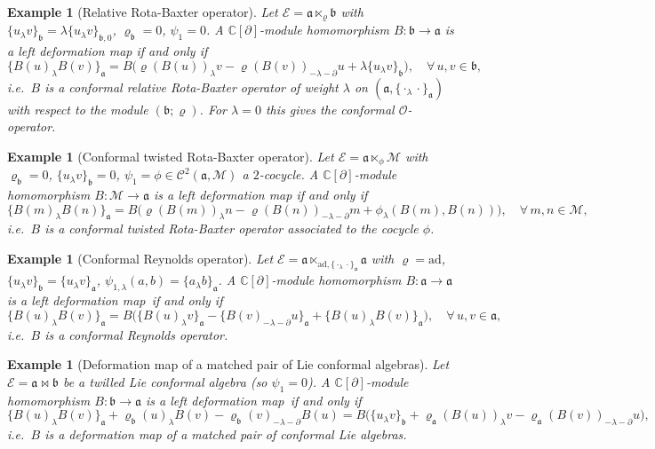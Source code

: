 \documentclass[a4paper,11pt]{article}
\def\Rg{\mathbb{C}[\partial]}
\def\Ep{\mathcal{E}}
\def\Vs{\mathfrak{a}}
\def\Ws{\mathfrak{b}}
\def\Mod{\mathcal{M}}
\def\rep{\varrho}
\def\Cch{\mathscr{C}}
\def\la{\lambda}
\def\p{\partial}
\newcommand{\ad}{\mathrm{ad}}
\numberwithin{equation}{section}
\newtheorem{example}[theorem]{Example}
\begin{document}
\begin{example}[Relative Rota-Baxter operator]\label{ex:conf-RRB}
Let $\Ep=\Vs\ltimes_\rep\Ws$ with $\{u_\la v\}_\Ws=\la\{u_\la v\}_{\Ws,0}$,
$\rep_\Ws=0$, $\psi_1=0$.
A $\Rg$-module homomorphism $B:\Ws\to\Vs$ is a left deformation map if and only if
\begin{equation}\label{eq:conf-RRB}
  \{B(u)_\la B(v)\}_\Vs
  = B\!\bigl(\rep(B(u))_\la v - \rep(B(v))_{-\la-\p}u
             + \la\{u_\la v\}_\Ws\bigr),
  \quad \forall\,u,v\in\Ws,
\end{equation}
i.e.\ $B$ is a \textit{conformal relative Rota-Baxter operator of weight $\la$}
on $(\Vs,\{\cdot_\la\cdot\}_\Vs)$ with respect to the module $(\Ws;\rep)$.
For $\la=0$ this gives the conformal $\mathcal{O}$-operator.
\end{example}
 
\begin{example}[Conformal twisted Rota-Baxter operator]\label{ex:conf-TRB}
Let $\Ep=\Vs\ltimes_\phi\Mod$ with $\rep_\Ws=0$, $\{u_\la v\}_\Ws=0$,
$\psi_1=\phi\in\Cch^2(\Vs,\Mod)$ a $2$-cocycle.
A $\Rg$-module homomorphism $B:\Mod\to\Vs$ is a left deformation map if and only if
\begin{equation}\label{eq:conf-TRB}
  \{B(m)_\la B(n)\}_\Vs
  = B\!\bigl(\rep(B(m))_\la n - \rep(B(n))_{-\la-\p}m
             + \phi_\la(B(m),B(n))\bigr),
  \quad \forall\,m,n\in\Mod,
\end{equation}
i.e.\ $B$ is a \textit{conformal twisted Rota-Baxter operator}
associated to the cocycle $\phi$.
\end{example}
 
\begin{example}[Conformal Reynolds operator]\label{ex:conf-Reynolds}
Let $\Ep=\Vs\ltimes_{\ad,\{\cdot_\la\cdot\}_\Vs}\Vs$ with $\rep=\ad$,
$\{u_\la v\}_\Ws=\{u_\la v\}_\Vs$, $\psi_{1,\la}(a,b)=\{a_\la b\}_\Vs$.
A $\Rg$-module homomorphism $B:\Vs\to\Vs$ is a left deformation map\ if and only if
\begin{equation}\label{eq:conf-Reynolds}
  \{B(u)_\la B(v)\}_\Vs
  = B\!\bigl(\{B(u)_\la v\}_\Vs - \{B(v)_{-\la-\p}u\}_\Vs
             + \{B(u)_\la B(v)\}_\Vs\bigr),
  \quad \forall\,u,v\in\Vs,
\end{equation}
i.e.\ $B$ is a \textit{conformal Reynolds operator}.
\end{example}
 
\begin{example}[Deformation map of a matched pair of Lie conformal  algebras]
\label{ex:conf-matched-pair}
Let $\Ep=\Vs\bowtie\Ws$ be a twilled Lie conformal  algebra
(so $\psi_1=0$).  A $\Rg$-module homomorphism $B:\Ws\to\Vs$ is a
left deformation map\ if and only if
\begin{equation}\label{eq:conf-matched-map}
  \{B(u)_\la B(v)\}_\Vs
  + \rep_\Ws(u)_\la B(v) - \rep_\Ws(v)_{-\la-\p}B(u)
  = B\!\bigl(\{u_\la v\}_\Ws + \rep_\Vs(B(u))_\la v
             - \rep_\Vs(B(v))_{-\la-\p}u\bigr),
\end{equation}
i.e.\ $B$ is a \textit{deformation map of a matched pair of conformal
Lie algebras}.
\end{example}
\end{document}
